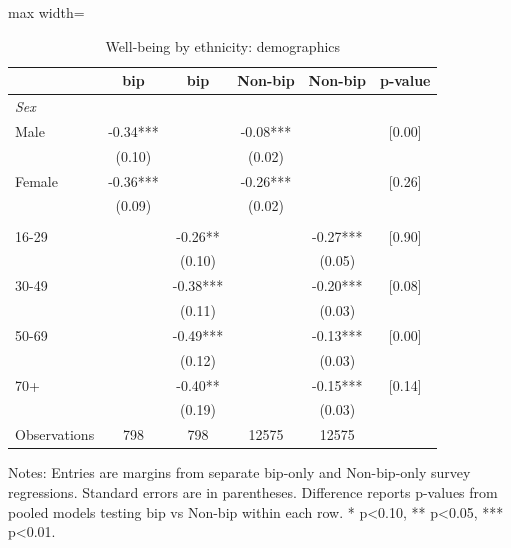 \begin{table}[htbp]
\centering
\caption{Well-being by ethnicity: demographics}
\small
\begin{adjustbox}{max width=\textwidth}
\begin{tabular}{p{4.8cm}ccccc}
\toprule
& bip & bip & Non-bip & Non-bip & p-value \\
\midrule
\multicolumn{6}{l}{\textit{Sex}} \\
Male & -0.34*** &  & -0.08*** &  & [0.00] \\
& (0.10) &  & (0.02) &  & \\
Female & -0.36*** &  & -0.26*** &  & [0.26] \\
& (0.09) &  & (0.02) &  & \\
\addlinespace
\multicolumn{6}{l}{\textit{Age group}} \\
16-29 &  & -0.26** &  & -0.27*** & [0.90] \\
&  & (0.10) &  & (0.05) & \\
30-49 &  & -0.38*** &  & -0.20*** & [0.08] \\
&  & (0.11) &  & (0.03) & \\
50-69 &  & -0.49*** &  & -0.13*** & [0.00] \\
&  & (0.12) &  & (0.03) & \\
70+ &  & -0.40** &  & -0.15*** & [0.14] \\
&  & (0.19) &  & (0.03) & \\
\midrule
Observations & 798 & 798 & 12575 & 12575 & \\
\bottomrule
\end{tabular}
\end{adjustbox}

\begin{flushleft}
\footnotesize Notes: Entries are margins from separate bip-only and Non-bip-only survey regressions. Standard errors are in parentheses. Difference reports p-values from pooled models testing bip vs Non-bip within each row. * p<0.10, ** p<0.05, *** p<0.01.
\end{flushleft}
\end{table}